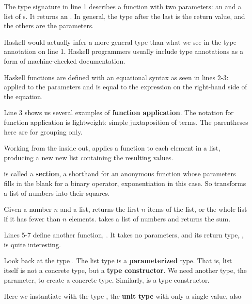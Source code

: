 \begin{notelist}
    \item The type signature in line 1 describes a function with two parameters: an  and a list
          of s. It returns an . In general, the type after the last \code{->}
          is the return value, and the others are the parameters.
    \item Haskell would actually infer a more general type than what we see in the type annotation 
          on line 1. Haskell programmers usually include type annotations as a form of machine-checked
          documentation.
    \item Haskell functions are defined with an equational syntax as seen in lines 2-3: 
          applied to the parameters  and  is equal to the expression on the
          right-hand side of the equation.
    \item Line 3 shows us several examples of \textbf{function application}. The notation for function application
          is lightweight: simple juxtaposition of terms. The parentheses here are for grouping only. 
    \item Working from the inside out,  applies a function to each element in a list, producing a new 
          new list containing the resulting values.
    \item {} is called a \textbf{section}, a shorthand for an anonymous function whose parameters
          fills in the blank for a binary operator, exponentiation in this case. So 
          transforms a list of numbers into their squares.
    \item Given a number $n$ and a list,  returns the first $n$ items of the list, or the whole list
          if it has fewer than $n$ elements.  takes a list of numbers and returns the sum.
    \item Lines 5-7 define another function, . It takes no parameters, and its return type, ,
          is quite interesting.
    \item Look back at the type \code{[Int]}. The list type \code{[]} is a
          \textbf{parameterized} type. That is, list itself is not a concrete type, but a \textbf{type constructor}.
          We need another type, the parameter, to create a concrete type. Similarly,  is a type constructor.
    \item Here we instantiate  with the type \code{()}, the \textbf{unit type} with only a single value, also

\end{notelist}
